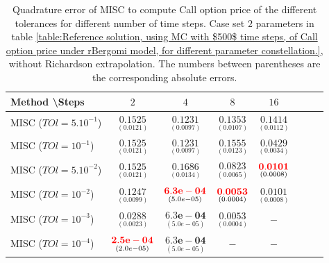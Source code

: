 \documentclass[11pt]{article}
\begin{document}
\begin{table}[h!]
	\centering
	\begin{tabular}{l*{6}{c}r}
		Method \textbackslash  Steps            & $2$ & $4$ & $8$ & $16$  \\
		\hline
		MISC ($TOl=5.10^{-1}$)  & $\underset{(     0.0121)}{\mathbf{
				 0.1525}}$ & $\underset{(    0.0097)}{\mathbf{      0.1231
			}}$ & $\underset{(   0.0107)}{\mathbf{0.1353
		}}$ & $\underset{(  0.0112)}{\mathbf{0.1414}}$  \\
		MISC ($TOl=10^{-1}$)  & $\underset{(     0.0121)}{\mathbf{
				0.1525}}$ & $\underset{(    0.0097)}{\mathbf{      0.1231
			}}$ & $\underset{( 0.0123
		
			)}{\mathbf{    0.1555}}$ & $\underset{(0.0034)}{\mathbf{0.0429}}$  \\
		MISC ($TOl=5.10^{-2}$)  &$\underset{(     0.0121)}{\mathbf{
				0.1525}}$& $\underset{(     0.0134
			)}{\mathbf{  
				0.1686}}$ & $\underset{(   0.0065)}{\mathbf{ 0.0823}}$ & $\underset{(0.0008)}{\mathbf{
				\red{0.0101}}}$  \\
		MISC ($TOl=10^{-2}$)  & $\underset{(    0.0099
			)}{\mathbf{     0.1247
		}}$ & $\underset{(   5.0e-05)}{\mathbf{\red{  6.3e-04}
	}}$ & $\underset{(0.0004)}{\mathbf{\red{0.0053}}}$ & $\underset{(0.0008)}{\mathbf{0.0101}}$  \\
		MISC ($TOl=10^{-3}$)        & $\underset{(    
			0.0023)}{\mathbf{0.0288}}$  &$\underset{(   5.0e-05)}{\mathbf{  6.3e-04
		}}$ & $\underset{(0.0004)}{\mathbf{0.0053}}$ &  $-$ \\
		MISC ($TOl=10^{-4}$)        & $\underset{(2.0e-05)}{\mathbf{  \red{ 2.5e-04}}} $ &$\underset{(   5.0e-05)}{\mathbf{ 6.3e-04
		}}$ &  $-$ &  $-$ \\	
		
		\hline
	\end{tabular}
	\caption{Quadrature error of MISC to compute Call option price of the different tolerances for different number of time steps. Case  set $2$ parameters in table \ref{table:Reference solution, using MC with $500$ time steps, of Call option price under rBergomi model, for different parameter constellation.}, without Richardson extrapolation. The numbers between parentheses are the corresponding absolute errors.}
	\label{Quadrature error of MISC to compute Call option price of the different tolerances for different number of time steps. Case  set $2$ parameters, without Richardson extrapolation. The numbers between parentheses are the corresponding absolute errors,linear}
\end{table}
\end{document}
